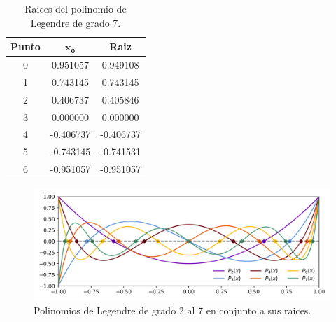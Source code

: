 \begin{table}[H]
    \centering
    \begin{tabular}{ccc} \hline
        \textbf{Punto} & $\mathbf{x_0}$ & \textbf{Raiz} \\ \hline
        0              & 0.951057       & 0.949108      \\
        1              & 0.743145       & 0.743145      \\
        2              & 0.406737       & 0.405846      \\
        3              & 0.000000       & 0.000000      \\
        4              & -0.406737      & -0.406737     \\
        5              & -0.743145      & -0.741531     \\
        6              & -0.951057      & -0.951057     \\  \hline
    \end{tabular}
    \caption{Raices del polinomio de Legendre de grado 7.}
    \label{table:problema2_7}
\end{table}

\begin{figure}[H]
    \centering
    \includegraphics[width=16cm]{Graphics/problema2.png}
    \caption{Polinomios de Legendre de grado 2 al 7 en conjunto a sus raices.}
    \label{fig:problema2}
\end{figure}